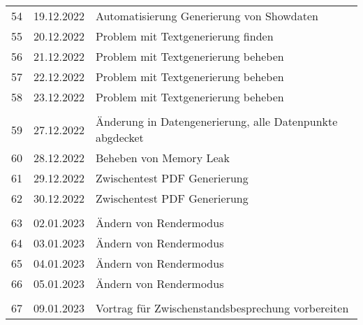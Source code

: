\begin{longtable}{|l|c|l|}
&               &                                                       \\ \hline 
54  & 19.12.2022    &  Automatisierung Generierung von Showdaten                                                    \\ \hline 
55  & 20.12.2022    &  Problem mit Textgenerierung finden                                                     \\ \hline 
56  & 21.12.2022    &  Problem mit Textgenerierung beheben                                                    \\ \hline 
57  & 22.12.2022    &  Problem mit Textgenerierung beheben                                                        \\ \hline 
58  & 23.12.2022    &  Problem mit Textgenerierung beheben                                                        \\ \hline 
&               &                                                       \\ \hline 
59  & 27.12.2022    & Änderung in Datengenerierung, alle Datenpunkte abgdecket                                                      \\ \hline 
60  & 28.12.2022    & Beheben von Memory Leak                                                      \\ \hline 
61  & 29.12.2022    & Zwischentest PDF Generierung                                                      \\ \hline 
62  & 30.12.2022    & Zwischentest PDF Generierung                                                      \\ \hline 
&               &                                                       \\ \hline 
63  & 02.01.2023    & Ändern von Rendermodus                                                      \\ \hline 
64  & 03.01.2023    & Ändern von Rendermodus                                                        \\ \hline 
65  & 04.01.2023    & Ändern von Rendermodus                                                        \\ \hline 
66  & 05.01.2023    & Ändern von Rendermodus                                                        \\ \hline 
&               &                                                       \\ \hline 
67  & 09.01.2023    & Vortrag für Zwischenstandsbesprechung vorbereiten                                                       \\ \hline 

\end{longtable}
